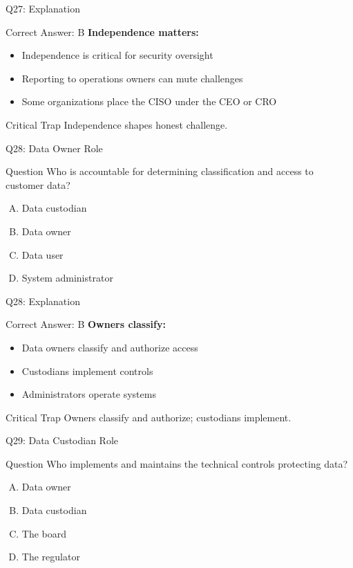 \documentclass{beamer}
\begin{document}
	\begin{frame}{Q27: Explanation}
		\begin{block}{Correct Answer: B}
			\textbf{Independence matters:}
			\begin{itemize}
				\item Independence is critical for security oversight
				\item Reporting to operations owners can mute challenges
				\item Some organizations place the CISO under the CEO or CRO
			\end{itemize}
		\end{block}
		\begin{alertblock}{Critical Trap}
			Independence shapes honest challenge.
		\end{alertblock}
	\end{frame}
	
	\begin{frame}{Q28: Data Owner Role}
		\begin{block}{Question}
			Who is accountable for determining classification and access to customer data?
		\end{block}
		\begin{enumerate}[(A)]
			\item Data custodian
			\item Data owner
			\item Data user
			\item System administrator
		\end{enumerate}
	\end{frame}
	
	\begin{frame}{Q28: Explanation}
		\begin{block}{Correct Answer: B}
			\textbf{Owners classify:}
			\begin{itemize}
				\item Data owners classify and authorize access
				\item Custodians implement controls
				\item Administrators operate systems
			\end{itemize}
		\end{block}
		\begin{alertblock}{Critical Trap}
			Owners classify and authorize; custodians implement.
		\end{alertblock}
	\end{frame}
	
	\begin{frame}{Q29: Data Custodian Role}
		\begin{block}{Question}
			Who implements and maintains the technical controls protecting data?
		\end{block}
		\begin{enumerate}[(A)]
			\item Data owner
			\item Data custodian
			\item The board
			\item The regulator
		\end{enumerate}
	\end{frame}
	
\end{document}

